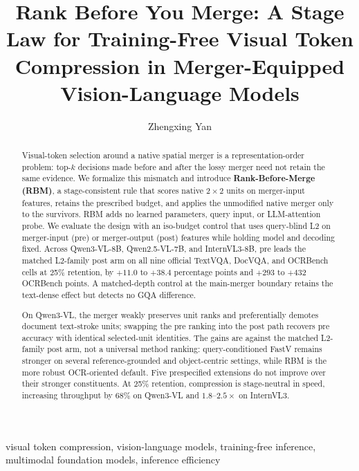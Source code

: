 \documentclass[journal]{IEEEtran}
\title{Rank Before You Merge: A Stage Law for Training-Free Visual Token
  Compression in Merger-Equipped Vision-Language Models}
\author{Zhengxing Yan}
\begin{document}
\maketitle

\begin{abstract}
Visual-token selection around a native spatial merger is a representation-order
problem: top-$k$ decisions made before and after the lossy merger need not retain
the same evidence. We formalize this mismatch and introduce
\textbf{Rank-Before-Merge (RBM)}, a stage-consistent rule that scores native
$2\!\times\!2$ units on merger-input features, retains the prescribed budget,
and applies the unmodified native merger only to the survivors. RBM adds no
learned parameters, query input, or LLM-attention probe. We evaluate the design
with an iso-budget control that uses query-blind L2 on merger-input (pre) or
merger-output (post) features while holding model and decoding fixed. Across
Qwen3-VL-8B, Qwen2.5-VL-7B, and InternVL3-8B, pre leads the
matched L2-family post arm on all nine official TextVQA, DocVQA, and OCRBench cells at
25\% retention, by $+11.0$ to $+38.4$ percentage points and $+293$ to $+432$
OCRBench points. A matched-depth control at the main-merger boundary retains
the text-dense effect but detects no GQA difference.

On Qwen3-VL, the merger weakly preserves unit ranks and preferentially demotes
document text-stroke units; swapping the pre ranking into the post path recovers
pre accuracy with identical selected-unit identities. The gains are against the
matched L2-family post arm,
not a universal method ranking: query-conditioned FastV remains stronger on
several reference-grounded and object-centric settings, while RBM is the more
robust OCR-oriented default. Five prespecified extensions do not improve over
their stronger constituents. At 25\% retention, compression is stage-neutral in
speed, increasing throughput by $68\%$ on Qwen3-VL and
$1.8$--$2.5\times$ on InternVL3.
\end{abstract}

\begin{IEEEkeywords}
visual token compression, vision-language models, training-free inference,
multimodal foundation models, inference efficiency
\end{IEEEkeywords}
\end{document}
